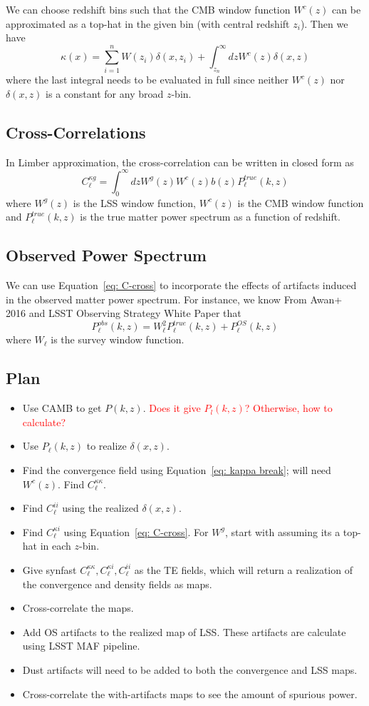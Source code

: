 \documentclass{article}
\newcommand{\eq}[1]{\begin{equation}{#1}\end{equation}}
\newcommand{\clred}[1]{\textcolor{red}{#1}}
\begin{document}
{We can choose redshift bins such that the CMB window function $W^c(z)$ can be approximated as a top-hat in the given bin (with central redshift $z_i$). Then we have
\eq{\kappa(x)= \sum_{i=1}^n W(z_i)\delta(x,z_i) +  \int_{z_n}^\infty dz W^c(z)\delta(x,z) \label{eq: kappa break}}
where the last integral needs to be evaluated in full since neither $W^c(z)$ nor $\delta(x,z) $ is a constant for any broad $z$-bin.

\subsection*{Cross-Correlations}
In Limber approximation, the cross-correlation can be written in closed form as
\eq{C_\ell^{\kappa g}= \int_0^\infty dz W^g(z)W^c(z)b(z)P^{true}_\ell(k, z) \label{eq: C-cross}}
where $W^g(z)$ is the LSS window function, $W^c(z)$ is the CMB window function and $P^{true}_\ell(k, z)$ is the true matter power spectrum as a function of redshift.

\subsection*{Observed Power Spectrum}
We can use Equation~\ref{eq: C-cross} to incorporate the effects of artifacts induced in the observed matter power spectrum. For instance, we know From Awan+ 2016 and LSST Observing Strategy White Paper that
\eq{P^{obs}_\ell(k, z)= W_\ell^2 P^{true}_\ell(k, z) + P^{OS}_\ell(k, z) \label{eq: Pobs}}
where $W_\ell$ is the survey window function.

\subsection*{Plan}
\begin{itemize}
\item Use CAMB to get $P(k,z)$. \clred{Does it give $P_l(k,z)$? Otherwise, how to calculate?}
\item Use  $P_\ell(k,z)$ to realize $\delta(x, z)$. 
\item Find the convergence field using Equation~\ref{eq: kappa break}; will need $W^c(z)$. Find $C_\ell^{\kappa\kappa}$.
\item Find $C_\ell^{ii}$ using the realized $\delta(x,z)$.
\item Find $C_\ell^{\kappa i}$ using Equation~\ref{eq: C-cross}. For $W^g$, start with assuming its a top-hat in each $z$-bin.
\item Give synfast $C_\ell^{\kappa\kappa}, C_\ell^{\kappa i}, C_\ell^{ii}$ as the TE fields, which will return a realization of the convergence and density fields as maps.
\item Cross-correlate the maps.
\item Add OS artifacts to the realized map of LSS. These artifacts are calculate using LSST MAF pipeline.
\item Dust artifacts will need to be added to both the convergence and LSS maps. 
\item Cross-correlate the with-artifacts maps to see the amount of spurious power.
\end{itemize}

}
\end{document}
